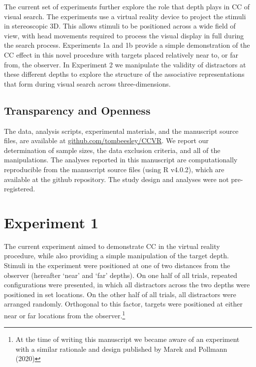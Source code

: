 \documentclass[
  english,
  man,floatsintext]{apa7}
\begin{document}
The current set of experiments further explore the role that depth plays in CC of visual search. The experiments use a virtual reality device to project the stimuli in stereoscopic 3D. This allows stimuli to be positioned across a wide field of view, with head movements required to process the visual display in full during the search process. Experiments 1a and 1b provide a simple demonstration of the CC effect in this novel procedure with targets placed relatively near to, or far from, the observer. In Experiment 2 we manipulate the validity of distractors at these different depths to explore the structure of the associative representations that form during visual search across three-dimensions.

\hypertarget{transparency-and-openness}{%
\subsection{Transparency and Openness}\label{transparency-and-openness}}

The data, analysis scripts, experimental materials, and the manuscript source files, are available at \href{https://github.com/tombeesley/CCVR}{github.com/tombeesley/CCVR}. We report our determination of sample sizes, the data exclusion criteria, and all of the manipulations. The analyses reported in this manuscript are computationally reproducible from the manuscript source files (using R v4.0.2), which are available at the github repository. The study design and analyses were not pre-registered.

\hypertarget{experiment-1}{%
\section{Experiment 1}\label{experiment-1}}

The current experiment aimed to demonstrate CC in the virtual reality procedure, while also providing a simple manipulation of the target depth. Stimuli in the experiment were positioned at one of two distances from the observer (hereafter `near' and `far' depths). On one half of all trials, repeated configurations were presented, in which all distractors across the two depths were positioned in set locations. On the other half of all trials, all distractors were arranged randomly. Orthogonal to this factor, targets were positioned at either near or far locations from the observer.\footnote{At the time of writing this manuscript we became aware of an experiment with a similar rationale and design published by Marek and Pollmann (2020)}
\end{document}
